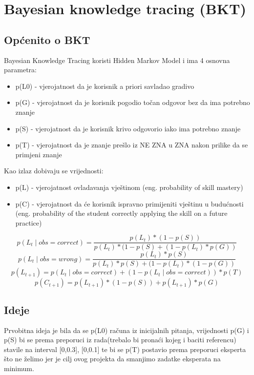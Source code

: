 \documentclass[times, utf8,projekt]{fer}
\begin{document}
\chapter{Bayesian knowledge tracing (BKT)}
\section{Općenito o BKT}
Bayesian Knowledge Tracing koristi Hidden Markov Model i ima 4 osnovna parametra:
\begin{itemize}
	\item p(L0) - vjerojatnost da je korisnik a priori savladao gradivo
	\item p(G) - vjerojatnost da je korisnik pogodio točan odgovor bez da ima potrebno znanje	
	\item p(S) - vjerojatnost da je korisnik krivo odgovorio iako ima potrebno znanje	
	\item p(T) - vjerojatnost da je znanje prešlo iz NE ZNA u ZNA nakon prilike da se primjeni znanje
\end{itemize}
Kao izlaz dobivaju se vrijednosti:
\begin{itemize}
	\item p(L) - vjerojatnost ovladavanja vještinom (eng. probability of skill mastery)
	\item p(C) - vjerojatnost da će korisnik ispravno primijeniti vještinu u budućnosti (eng. probability of the student correctly applying the skill on a future practice)\newline
\end{itemize}

\begin{equation}
 p(L_t\mid obs=correct)=\frac{p(L_t)*(1-p(S))}{p(L_t)*(1-p(S)+(1-p(L_t)*p(G))}
\end{equation}\newline
\begin{equation}
 p(L_t\mid obs=wrong)=\frac{p(L_t)*p(S)}{p(L_t)*p(S)+(1-p(L_t)*(1-p(G))}
\end{equation}\newline
\begin{equation}
 p(L_{t+1})=p(L_t\mid obs=correct) + (1-p(L_t\mid obs=correct))*p(T)
\end{equation}\newline
\begin{equation}
 p(C_{t+1})=p(L_{t+1}) * (1-p(S)) + p(L_{t+1})*p(G)
\end{equation}

\section{Ideje}
Prvobitna ideja je bila da se p(L0) računa iz inicijalnih pitanja, vrijednosti p(G) i p(S) bi se prema preporuci iz rada(trebalo bi pronaći kojeg i baciti referencu) stavile na interval [0,0.3], [0,0.1] te bi se p(T) postavio prema preporuci eksperta što ne želimo jer je cilj ovog projekta da smanjimo zadatke eksperata na minimum.
\end{document}
